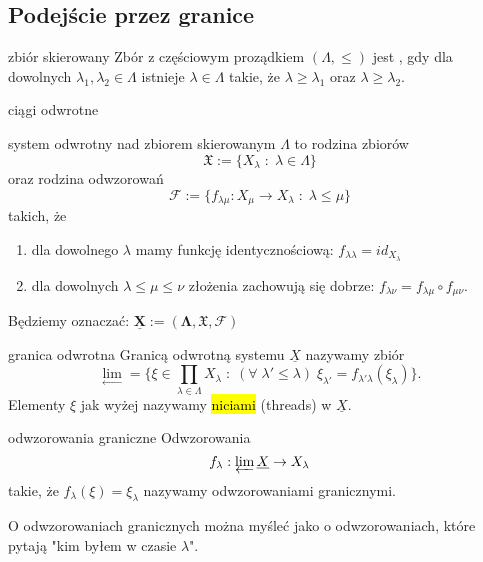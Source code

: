 \subsection{Podejście przez granice}

\begin{definition}{zbiór skierowany}{}
  Zbór z częściowym proządkiem $(\Lambda, \leq)$ jest , gdy dla dowolnych $\lambda_1,\lambda_2\in\Lambda$ istnieje $\lambda\in\Lambda$ takie, że $\lambda\geq \lambda_1$ oraz $\lambda\geq \lambda_2$.
\end{definition}

{\large\color{red}ciągi odwrotne}

\begin{definition}{system odwrotny}{}
   nad zbiorem skierowanym $\Lambda$ to rodzina zbiorów 
  $$\mathfrak{X}:=\{X_\lambda\;:\;\lambda\in\Lambda \}$$
  oraz rodzina odwzorowań
  $$\mathcal{F}:=\{f_{\lambda\mu}:X_\mu\to X_\lambda\;:\;\lambda\leq\mu \}$$
  takich, że 
  \begin{enumerate}
    \item dla dowolnego $\lambda$ mamy funkcję identycznościową: $f_{\lambda\lambda}=id_{X_\lambda}$
    \item dla dowolnych $\lambda\leq\mu\leq\nu$ złożenia zachowują się dobrze: $f_{\lambda\nu}=f_{\lambda\mu}\circ f_{\mu\nu}$.
  \end{enumerate}
\end{definition}

Będziemy oznaczać: $\boldsymbol{\underline{X}:=(\Lambda, \mathfrak{X}, \mathcal{F})}$

\begin{definition}{granica odwrotna}{}
  Granicą odwrotną systemu $\underline{X}$ nazywamy zbiór
  $$\underset{\leftarrow}{\lim}=\{\xi\in\prod_{\lambda\in\Lambda}X_\lambda\;:\;(\forall\;\lambda'\leq\lambda)\;\xi_{\lambda'}=f_{\lambda'\lambda}(\xi_\lambda)\}.$$
  Elementy $\xi$ jak wyżej nazywamy \hl{niciami} (threads) w $\underline{X}$.
\end{definition}

\begin{definition}{odwzorowania graniczne}{}
  Odwzorowania 
  $$f_\lambda:\varprojlim\underline{X}\to X_\lambda$$ 
  takie, że $f_\lambda(\xi)=\xi_\lambda$ nazywamy odwzorowaniami granicznymi.
\end{definition}

O odwzorowaniach granicznych można myśleć jako o odwzorowaniach, które pytają "kim byłem w czasie $\lambda$".

